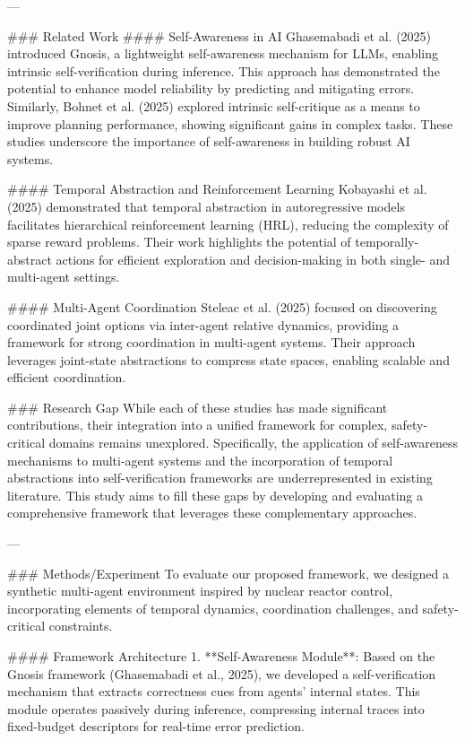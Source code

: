 ---

### Related Work  
#### Self-Awareness in AI  
Ghasemabadi et al. (2025) introduced Gnosis, a lightweight self-awareness mechanism for LLMs, enabling intrinsic self-verification during inference. This approach has demonstrated the potential to enhance model reliability by predicting and mitigating errors. Similarly, Bohnet et al. (2025) explored intrinsic self-critique as a means to improve planning performance, showing significant gains in complex tasks. These studies underscore the importance of self-awareness in building robust AI systems.

#### Temporal Abstraction and Reinforcement Learning  
Kobayashi et al. (2025) demonstrated that temporal abstraction in autoregressive models facilitates hierarchical reinforcement learning (HRL), reducing the complexity of sparse reward problems. Their work highlights the potential of temporally-abstract actions for efficient exploration and decision-making in both single- and multi-agent settings.

#### Multi-Agent Coordination  
Steleac et al. (2025) focused on discovering coordinated joint options via inter-agent relative dynamics, providing a framework for strong coordination in multi-agent systems. Their approach leverages joint-state abstractions to compress state spaces, enabling scalable and efficient coordination.

### Research Gap  
While each of these studies has made significant contributions, their integration into a unified framework for complex, safety-critical domains remains unexplored. Specifically, the application of self-awareness mechanisms to multi-agent systems and the incorporation of temporal abstractions into self-verification frameworks are underrepresented in existing literature. This study aims to fill these gaps by developing and evaluating a comprehensive framework that leverages these complementary approaches.

---

### Methods/Experiment  
To evaluate our proposed framework, we designed a synthetic multi-agent environment inspired by nuclear reactor control, incorporating elements of temporal dynamics, coordination challenges, and safety-critical constraints.

#### Framework Architecture  
1. **Self-Awareness Module**: Based on the Gnosis framework (Ghasemabadi et al., 2025), we developed a self-verification mechanism that extracts correctness cues from agents' internal states. This module operates passively during inference, compressing internal traces into fixed-budget descriptors for real-time error prediction.  

